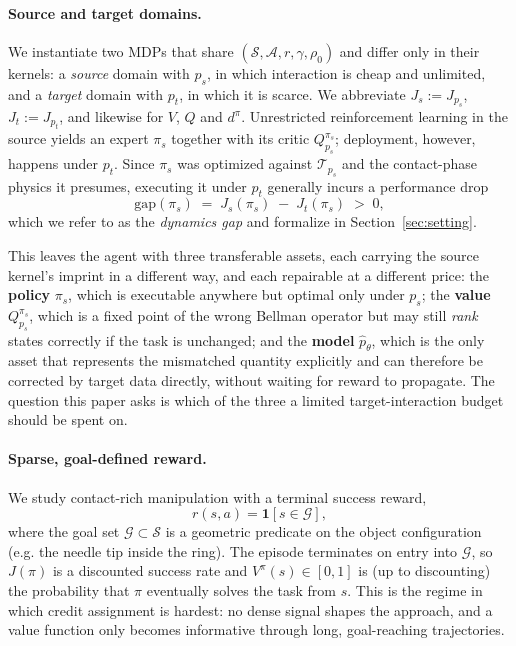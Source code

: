 \paragraph{Source and target domains.}
We instantiate two MDPs that share $(\mathcal{S}, \mathcal{A}, r, \gamma,
\rho_0)$ and differ only in their kernels: a \emph{source} domain with $p_s$,
in which interaction is cheap and unlimited, and a \emph{target} domain with
$p_t$, in which it is scarce. We abbreviate $J_s \!:=\! J_{p_s}$,
$J_t \!:=\! J_{p_t}$, and likewise for $V$, $Q$ and $d^\pi$. Unrestricted
reinforcement learning in the source yields an expert $\pi_s$ together with its
critic $Q^{\pi_s}_{p_s}$; deployment, however, happens under $p_t$. Since
$\pi_s$ was optimized against $\mathcal{T}_{p_s}$ and the contact-phase physics
it presumes, executing it under $p_t$ generally incurs a performance drop
\begin{equation}
\mathrm{gap}(\pi_s) \;=\; J_{s}(\pi_s) \;-\; J_{t}(\pi_s) \;>\; 0,
\label{eq:gapdef}
\end{equation}
which we refer to as the \emph{dynamics gap} and formalize in
Section~\ref{sec:setting}.

This leaves the agent with three transferable assets, each carrying the source
kernel's imprint in a different way, and each repairable at a different price:
the \textbf{policy} $\pi_s$, which is executable anywhere but optimal only under
$p_s$; the \textbf{value} $Q^{\pi_s}_{p_s}$, which is a fixed point of the wrong
Bellman operator but may still \emph{rank} states correctly if the task is
unchanged; and the \textbf{model} $\hat{p}_\theta$, which is the only asset that
represents the mismatched quantity explicitly and can therefore be corrected by
target data directly, without waiting for reward to propagate. The question this
paper asks is which of the three a limited target-interaction budget should be
spent on.

\paragraph{Sparse, goal-defined reward.}
We study contact-rich manipulation with a terminal success reward,
\begin{equation}
r(s,a) = \mathbf{1}\!\left[s \in \mathcal{G}\right],
\label{eq:sparse}
\end{equation}
where the goal set $\mathcal{G} \subset \mathcal{S}$ is a geometric predicate on
the object configuration (e.g. the needle tip inside the ring). The episode
terminates on entry into $\mathcal{G}$, so $J(\pi)$ is a discounted success
rate and $V^{\pi}(s) \in [0,1]$ is (up to discounting) the probability that
$\pi$ eventually solves the task from $s$. This is the regime in which
credit assignment is hardest: no dense signal shapes the approach, and a
value function only becomes informative through long, goal-reaching
trajectories.

